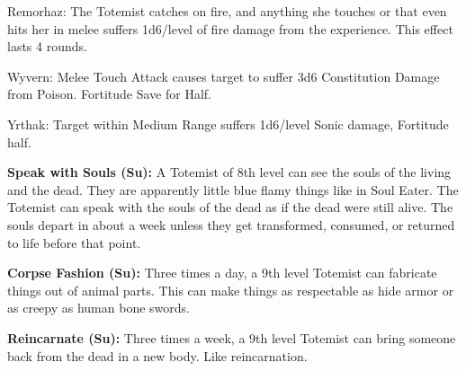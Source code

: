 \begin{description*}
\item[Remorhaz:] The Totemist catches on fire, and anything she touches or that even hits her in melee suffers 1d6/level of fire damage from the experience. This effect lasts 4 rounds.
\item[Wyvern:] Melee Touch Attack causes target to suffer 3d6 Constitution Damage from Poison. Fortitude Save for Half.
\item[Yrthak:] Target within Medium Range suffers 1d6/level Sonic damage, Fortitude half.
\end{description*}

\textbf{Speak with Souls (Su):} A Totemist of 8th level can see the souls of the living and the dead. They are apparently little blue flamy things like in Soul Eater. The Totemist can speak with the souls of the dead as if the dead were still alive. The souls depart in about a week unless they get transformed, consumed, or returned to life before that point.

\textbf{Corpse Fashion (Su):} Three times a day, a 9th level Totemist can fabricate things out of animal parts. This can make things as respectable as hide armor or as creepy as human bone swords.

\textbf{Reincarnate (Su):} Three times a week, a 9th level Totemist can bring someone back from the dead in a new body. Like reincarnation.

